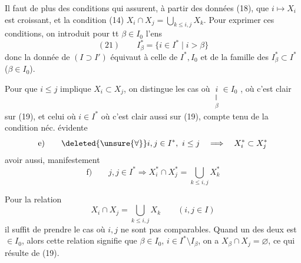 Il faut de plus des conditions qui assurent,
à partir des données (18), que $i\mapsto X_i$
est croissant, et  la condition (14)
$X_i\cap X_j=\bigcup_{k\le i,j}X_k$. Pour  exprimer ces conditions,
on introduit pour tt $\beta\in I_0$ l'ens
\[
(21)\qquad I_\beta^*=\{i\in I^*\mid i>\beta\}
\]
donc la donnée de $(I\supset I')$
 équivaut à celle
de $I^*,I_0$  et de la famille des
$I_\beta^*\subset I^*$ ($\beta\in I_0$).

Pour  que 
$i\le j$  implique $X_i\subset X_j$,
on distingue les cas où $\underset{\substack{\Vert\\\beta}}{i}\in I_0$
, où c'est
clair sur (19), et celui où $i\in I^*$ où  c'est
clair aussi sur (19), compte tenu de la condition
néc. évidente
\[
\text{e)}\qquad \deleted{\unsure{\forall}} i,j\in I^*,\ i\le j
\quad\Longrightarrow\quad X_i^*\subset X_j^*
\]
 avoir aussi, manifestement
\[
\text{f)}\qquad j,j\in I^*\Longrightarrow
X_i^*\cap X_j^*=\bigcup_{k\le i,j}X_k^*
\]

Pour la relation
\[
X_i\cap X_j=\bigcup_{k\le i,j}X_k\qquad(i,j\in I)
\]
il  suffit de prendre le cas où $i,j$ ne
sont pas comparables. Quand un des deux
est $\in I_0$, alors cette relation  signifie que
$\beta\in I_0$, $i\in I^*\setminus I_\beta$, on a
$X_\beta\cap X_j=\varnothing$, ce qui résulte de (19).
